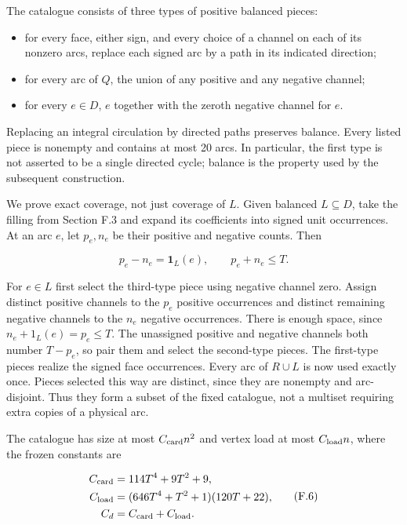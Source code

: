 \documentclass[english,11pt,a4paper]{article}
\providecommand{\tightlist}{\setlength{\itemsep}{0pt}\setlength{\parskip}{0pt}}
\newcounter{none}
\begin{document}
The catalogue consists of three types of positive balanced pieces:

\begin{itemize}
\tightlist
\item
  for every face, either sign, and every choice of a channel on each of its nonzero arcs, replace each signed arc by a path in its indicated direction;
\item
  for every arc of \(Q\), the union of any positive and any negative channel;
\item
  for every \(e\in D\), \(e\) together with the zeroth negative channel for \(e\).
\end{itemize}

Replacing an integral circulation by directed paths preserves balance. Every listed piece is nonempty and contains at most 20 arcs. In particular, the first type is not asserted to be a single directed cycle; balance is the property used by the subsequent construction.

We prove exact coverage, not just coverage of \(L\). Given balanced \(L\subseteq D\), take the filling from Section F.3 and expand its coefficients into signed unit occurrences. At an arc \(e\), let \(p_{e},n_{e}\) be their positive and negative counts. Then

\[p_e-n_e=\mathbf1_L(e),\qquad p_e+n_e\le T.\]

For \(e\in L\) first select the third-type piece using negative channel zero. Assign distinct positive channels to the \(p_{e}\) positive occurrences and distinct remaining negative channels to the \(n_{e}\) negative occurrences. There is enough space, since \(n_{e}+1_{L}(e)=p_{e}\le T\). The unassigned positive and negative channels both number \(T-p_{e}\), so pair them and select the second-type pieces. The first-type pieces realize the signed face occurrences. Every arc of \(R\cup L\) is now used exactly once. Pieces selected this way are distinct, since they are nonempty and arc-disjoint. Thus they form a subset of the fixed catalogue, not a multiset requiring extra copies of a physical arc.

The catalogue has size at most \(C_{\rm card}n^2\) and vertex load at most \(C_{\rm load}n\), where the frozen constants are

\[\begin{aligned}C_{\rm card}&=114T^4+9T^2+9,\\C_{\rm load}&=(646T^4+T^2+1)(120T+22),\\C_d&=C_{\rm card}+C_{\rm load}.\end{aligned}\tag{F.6}\]
\end{document}

